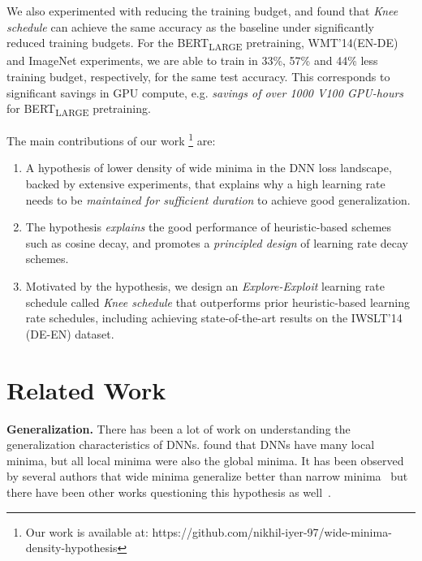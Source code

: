 \documentclass[twoside,11pt]{article}
\newcommand{\lrschedule}{\textit{Knee schedule}}
\begin{document}
We also experimented with reducing the training budget, and found that \lrschedule{} can achieve the same accuracy as the baseline under significantly reduced training budgets. For the BERT\textsubscript{LARGE} pretraining, WMT'14(EN-DE) and ImageNet experiments, we are able to train in 33\%, 57\% and 44\% less training budget, respectively, for the same test accuracy. This corresponds to significant savings in GPU compute, e.g. \textit{savings of over 1000 V100 GPU-hours} for BERT\textsubscript{LARGE} pretraining.




The main contributions of our work \footnote{Our work is available at:  https://github.com/nikhil-iyer-97/wide-minima-density-hypothesis} are:
\begin{enumerate}[nosep]
 \item A hypothesis of lower density of wide minima in the DNN loss landscape, backed by extensive experiments, that explains why a high learning rate needs to be {\it maintained for sufficient duration} to achieve good generalization.
  \item The hypothesis {\it explains} the good performance of heuristic-based schemes such as cosine decay,  and promotes a {\it principled design} of learning rate decay schemes.
 \item Motivated by the hypothesis, we design an {\it Explore-Exploit} learning rate schedule called \lrschedule{} that outperforms prior heuristic-based learning rate schedules, including achieving state-of-the-art results on the  IWSLT’14 (DE-EN) dataset.
\end{enumerate}
\vspace{-4pt} \section{Related Work}
\label{sec:related_work}

\noindent
{\bf Generalization.}
There has been a lot of work on understanding the generalization characteristics of DNNs. \citet{kawaguchi2016deep} found that DNNs have many local minima, but all local minima were also the global minima. It has been observed by several authors that wide minima generalize better than narrow minima~\citep{arora2018stronger,hochreiter1997flat,keskar2016large,jastrzkebski2017three,wang2018identifying} but there have been other works questioning this hypothesis as well~\citep{dinh2017sharp,golatkar2019time,guiroy2019towards,jastrzebski_iclr_2019,yoshida2017spectral}.
\end{document}
